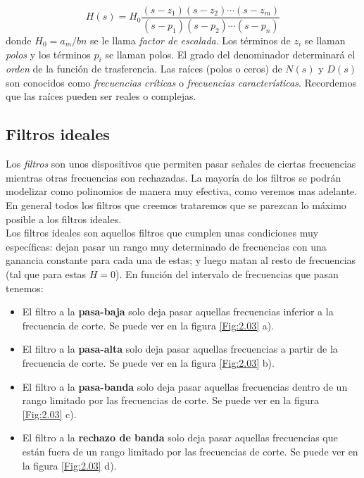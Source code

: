 \documentclass[11pt]{article} %
\begin{document}
\begin{equation}
H(s) = H_0 \dfrac{(s-z_1)(s-z_2)\cdots(s-z_m)}{(s-p_1)(s-p_2)\cdots (s-p_n)}
\end{equation}
donde $H_0 = a_m / bn$ se le llama \textit{factor de escalada}. Los términos de $z_i$ se llaman \textit{polos} y los términos $p_i$ se llaman polos. El grado del denominador determinará el \textit{orden} de la función de trasferencia. Las raíces (polos o ceros) de $N(s)$ y $D(s)$ son conocidos como \textit{frecuencias críticas} o \textit{frecuencias características}. Recordemos que las raíces pueden ser reales o complejas. 


\subsection{Filtros ideales}

Los \textit{filtros} son unos dispositivos que permiten pasar señales de ciertas frecuencias mientras otras frecuencias son rechazadas. La mayoría de los filtros se podrán modelizar como polinomios de manera muy efectiva, como veremos mas adelante. En general todos los filtros que creemos trataremos que se parezcan lo máximo posible a los filtros ideales. \\

Los filtros ideales son aquellos filtros que cumplen unas condiciones muy específicas: dejan pasar un rango muy determinado de frecuencias con una ganancia constante para cada una de estas; y luego matan al resto de frecuencias (tal que para estas $H=0$). En función del intervalo de frecuencias que pasan tenemos:

\begin{itemize}
\item El filtro a la \textbf{pasa-baja} solo deja pasar aquellas frecuencias inferior a la frecuencia de corte. Se puede ver en la figura \ref{Fig:2.03} a).
\item El filtro a la \textbf{pasa-alta} solo deja pasar aquellas frecuencias a partir de la frecuencia de corte. Se puede ver en la figura \ref{Fig:2.03} b).
\item El filtro a la \textbf{pasa-banda} solo deja pasar aquellas frecuencias dentro de un rango limitado por las frecuencias de corte. Se puede ver en la figura \ref{Fig:2.03} c).
\item El filtro a la \textbf{rechazo de banda} solo deja pasar aquellas frecuencias que están fuera de un rango limitado por las frecuencias de corte. Se puede ver en la figura \ref{Fig:2.03} d).
\end{itemize}
\end{document}
